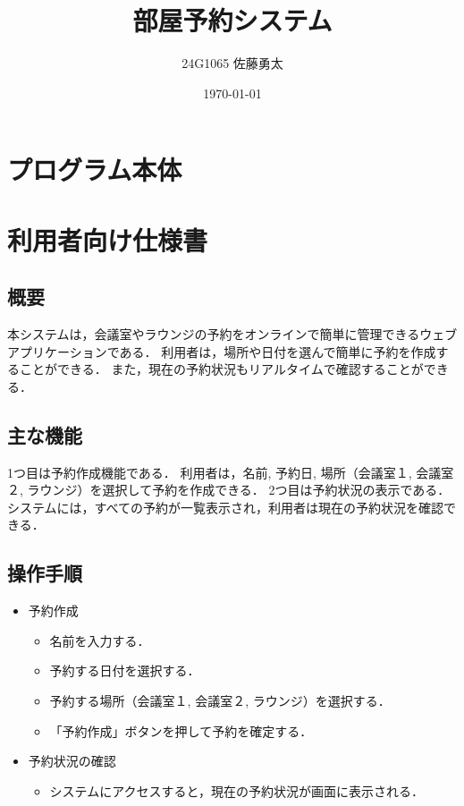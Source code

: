 \documentclass[uplatex,dvipdfmx]{jsarticle}
\begin{document}
\title{部屋予約システム}
\author{24G1065 佐藤勇太}
\date{\today}
\maketitle

\section{プログラム本体}


\section{利用者向け仕様書}

\subsection{概要}
本システムは，会議室やラウンジの予約をオンラインで簡単に管理できるウェブアプリケーションである．
利用者は，場所や日付を選んで簡単に予約を作成することができる．
また，現在の予約状況もリアルタイムで確認することができる．

\subsection{主な機能}
1つ目は予約作成機能である．
利用者は，名前, 予約日, 場所（会議室１, 会議室２, ラウンジ）を選択して予約を作成できる．
2つ目は予約状況の表示である．
システムには，すべての予約が一覧表示され，利用者は現在の予約状況を確認できる．

\subsection{操作手順}
\begin{itemize}
    \item 予約作成
    \begin{itemize}
        \item 名前を入力する．
        \item 予約する日付を選択する．
        \item 予約する場所（会議室１, 会議室２, ラウンジ）を選択する．
        \item 「予約作成」ボタンを押して予約を確定する．
    \end{itemize}
    \item 予約状況の確認
    \begin{itemize}
        \item システムにアクセスすると，現在の予約状況が画面に表示される．
    \end{itemize}
\end{itemize}
\end{document}
